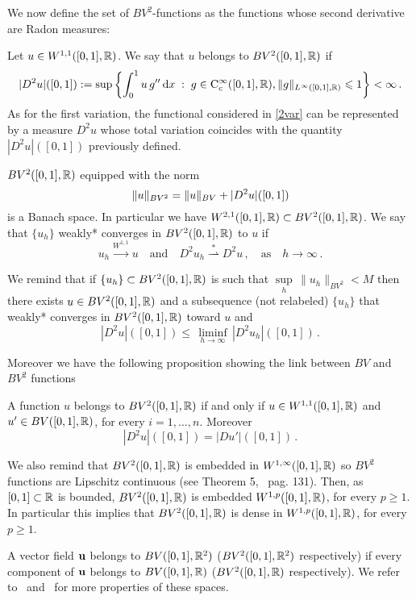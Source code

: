 We now define the set of $BV^2$-functions as the functions whose second derivative are Radon measures:
\begin{defn}
 Let $u\in W^{1,1}([0,1],\mathbb{R})$. 
 We say that $u$ belongs to $BV^2([0,1],\mathbb{R})$ if 
 \begin{equation}\label{2var}
 |D^2 u|([0,1]):=\sup \left\{ 
 		\int_0^1u\,g''\, \mathrm{d} x 
	 \;:\; 
		g\in \mathrm{C}^\infty_c({[0,1]},\mathbb{R} ),\|g\|_{L^{\infty}([0,1],\mathbb{R} )}\leqslant 1
	 \right\}
	< \infty\,.
\end{equation}
As for the first variation, the functional considered in \eqref{2var} can be represented by a measure $D^2u$ whose total variation coincides with  the quantity $|D^2 u|([0,1])$ previously defined.
\par $BV^2([0,1],\mathbb{R})$ equipped with the norm 
\begin{equation}\label{normbv2}
\|u\|_{BV^2} = \|u\|_{BV} + |D^2u |([0,1])
\end{equation}
is a Banach space. In particular we have $W^{2,1}([0,1],\mathbb{R})\subset BV^2([0,1],\mathbb{R})$.
 We say that $\{u_h\}$  weakly* converges in $BV^2([0,1],\mathbb{R})$ to $u$ if
$$u_h \overset{W^{1,1}}{\longrightarrow} u \quad\mbox{and}\quad D^2 u_h \overset{*}{\rightharpoonup}D^2 u\,, \quad\mbox{as}\quad h \rightarrow \infty\,.$$
\end{defn}
We remind that if $\{u_h\}\subset BV^2([0,1],\mathbb{R})$ is such that  $\underset{h}{\sup}\,\|u_h\|_{BV^2}< M$ then there exists $u\in  BV^2([0,1],\mathbb{R})$ and a subsequence (not relabeled)  $\{u_h\}$  that weakly* converges in $BV^2([0,1],\mathbb{R})$ toward $u$ and
$$|D^2u |([0,1]) \leq \, \underset{h \rightarrow \infty}{\liminf}\, |D^2 u_h |([0,1])\,.$$

Moreover we have the following proposition showing the link between $BV$ and $BV^2$ functions\begin{prop} \label{bv-bv2} A function $u$ belongs to $ BV^2([0,1],\mathbb{R})$ if and only if $u\in W^{1,1}([0,1],\mathbb{R})$ and $u' \in BV([0,1],\mathbb{R})$, for every $i=1,...,n$. Moreover
$$|D^2u|([0,1]) = \left|D u'\right|([0,1])\,.$$\end{prop}

\par We also remind that  
 $BV^2([0,1],\mathbb{R})$ is embedded in $ W^{1,\infty}([0,1],\mathbb{R})$ so $BV^2$ functions are  Lipschitz continuous (see Theorem 5,~\cite{EG} pag. 131). Then,  as $[0,1]\subset {\mathbb R}$ is bounded, $BV^2([0,1],\mathbb{R})$ is embedded $W^{1,p}([0,1],\mathbb{R})$, for every $p\geq 1$. In particular this implies that  $BV^2([0,1],\mathbb{R})$ is dense in $W^{1,p}([0,1],\mathbb{R})$, for every $p\geq 1$.
\par A vector field ${\bf u}$ belongs to $BV([0,1],\mathbb{R}^2)$ ($BV^2([0,1],\mathbb{R}^2)$ respectively)  if every component of ${\bf u}$ belongs to $BV([0,1],\mathbb{R})$ ($BV^2([0,1],\mathbb{R})$ respectively). 
We refer to~\cite{AFP} and~\cite{Demengel} for more properties of these spaces.

